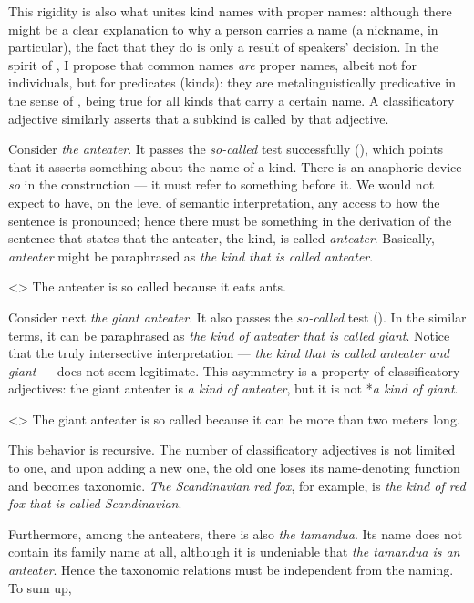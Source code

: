 \documentclass[a4paper, 12pt]{article}
\begin{document}
This rigidity is also what unites kind names with proper names: although there might be a clear explanation to why a person carries a name (a nickname, in particular), the fact that they do is only a result of speakers' decision. In the spirit of \parencite{kripke1980namingnecessity}, I propose that common names \emph{are} proper names, albeit not for individuals, but for predicates (kinds): they are metalinguistically predicative in the sense of \parencite{burge1973referencepropernames}, being true for all kinds that carry a certain name. A classificatory adjective similarly asserts that a subkind is called by that adjective.

Consider \textit{the anteater}. It passes the \textit{so-called} test successfully (\nextx), which points that it asserts something about the name of a kind. There is an anaphoric device \textit{so} in the construction --- it must refer to something before it. We would not expect to have, on the level of semantic interpretation, any access to how the sentence is pronounced; hence there must be something in the derivation of the sentence that states that the anteater, the kind, is called \textit{anteater}. Basically, \textit{anteater} might be paraphrased as \textit{the kind that is called anteater}.

\ex<>
    The anteater is so called because it eats ants.
\xe

Consider next \textit{the giant anteater}. It also passes the \textit{so-called} test (\nextx). In the similar terms, it can be paraphrased as \textit{the kind of anteater that is called giant}. Notice that the truly intersective interpretation --- \textit{the kind that is called anteater and giant} --- does not seem legitimate. This asymmetry is a property of classificatory adjectives: the giant anteater is \textit{a kind of anteater}, but it is not *\textit{a kind of giant}.

\ex<>
    The giant anteater is so called because it can be more than two meters long.
\xe

This behavior is recursive. The number of classificatory adjectives is not limited to one, and upon adding a new one, the old one loses its name-denoting function and becomes taxonomic. \textit{The Scandinavian red fox}, for example, is \textit{the kind of red fox that is called Scandinavian}.

Furthermore, among the anteaters, there is also \textit{the tamandua}. Its name does not contain its family name at all, although it is undeniable that \textit{the tamandua is an anteater}. Hence the taxonomic relations must be independent from the naming. To sum up,
\end{document}
